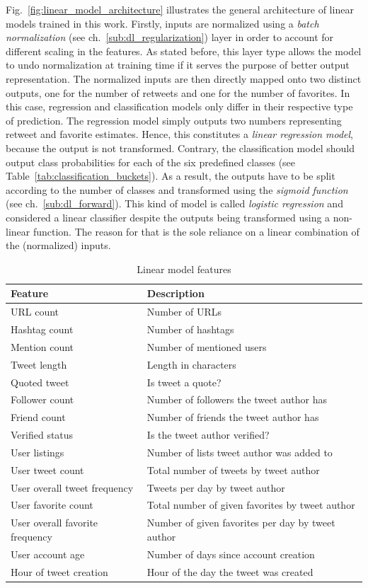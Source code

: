 Fig.~\ref{fig:linear_model_architecture} illustrates the general architecture
of linear models trained in this work.
Firstly, inputs are normalized using a \textit{batch normalization} (see ch.~\ref{sub:dl_regularization})
layer in order to account for different scaling in the features.
As stated before, this layer type allows the model to undo normalization at
training time if it serves the purpose of better output representation.
The normalized inputs are then directly mapped onto two distinct outputs,
one for the number of retweets and one for the number of favorites.
In this case, regression and classification models only differ in their
respective type of prediction.
The regression model simply outputs two numbers representing retweet and
favorite estimates.
Hence, this constitutes a \textit{linear regression model}, because the output is not transformed.
Contrary, the classification model should output class probabilities for each
of the six predefined classes (see Table~\ref{tab:classification_buckets}).
As a result, the outputs have to be split according to the number of classes and transformed
using the \textit{sigmoid function} (see ch.~\ref{sub:dl_forward}).
This kind of model is called \textit{logistic regression} and considered
a linear classifier despite the outputs being transformed using a non-linear
function.
The reason for that is the sole reliance on a linear combination of the
(normalized) inputs.

\begin{table}
\begin{tabular}{ll}
\toprule
Feature & Description \\
\midrule
URL count & Number of URLs \\
Hashtag count & Number of hashtags \\
Mention count & Number of mentioned users \\
Tweet length & Length in characters \\
Quoted tweet & Is tweet a quote? \\
\midrule
Follower count & Number of followers the tweet author has \\
Friend count & Number of friends the tweet author has \\
Verified status & Is the tweet author verified? \\
User listings & Number of lists tweet author was added to \\
User tweet count & Total number of tweets by tweet author \\
User overall tweet frequency & Tweets per day by tweet author \\
User favorite count & Total number of given favorites by tweet author \\
User overall favorite frequency & Number of given favorites per day by tweet author \\
User account age & Number of days since account creation \\
Hour of tweet creation & Hour of the day the tweet was created \\
\bottomrule
\end{tabular}
\caption{Linear model features}
\label{tab:structured_features}
\end{table}

